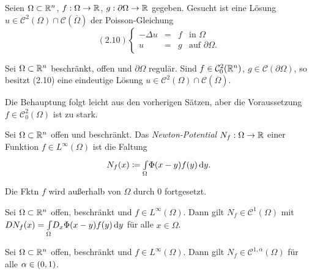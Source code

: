 \documentclass{cheat-sheet}
\begin{document}



\begin{problem}
  Seien $\Omega \subset \mathbb{R}^n$, $f : \Omega \to \mathbb{R}$, $g : \partial \Omega \to \mathbb{R}$ gegeben. Gesucht ist eine Lösung $u \in \mathcal{C}^2(\Omega) \cap \mathcal{C}(\overline{\Omega})$ der Poisson-Gleichung
  \[
    (2.10) \left\{ \begin{array}{rlll}
      - \Delta u &=& f & \text{in $\Omega$}\\
      u &=& g & \text{auf $\partial \Omega$.}
    \end{array} \right.
  \]
\end{problem}

\begin{prop}
  Sei $\Omega \subset \mathbb{R}^n$ beschränkt, offen und $\partial \Omega$ regulär. Sind $f \in \mathcal{C}^2_0(\mathbb{R}^n)$, $g \in \mathcal{C}(\partial \Omega)$, so besitzt (2.10) eine eindeutige Lösung $u \in \mathcal{C}^2(\Omega) \cap \mathcal{C}(\overline{\Omega})$.
\end{prop}

\begin{bem}
  Die Behauptung folgt leicht aus den vorherigen Sätzen, aber die Voraussetzung $f \in \mathcal{C}^2_0(\Omega)$ ist zu stark.
\end{bem}

\begin{defn}
  Sei $\Omega \subset \mathbb{R}^n$ offen und beschränkt. Das \emph{Newton-Potential} $N_f : \Omega \to \mathbb{R}$ einer Funktion $f \in L^\infty(\Omega)$ ist die Faltung
  \[ N_f(x) \coloneqq {\textstyle \int\limits_{\Omega}^{}} \Phi(x-y) f(y) \,\mathrm{d} y. \]
\end{defn}

\begin{bem}
  Die Fktn $f$ wird außerhalb von $\Omega$ durch $0$ fortgesetzt.
\end{bem}

\begin{lem}
  Sei $\Omega \subset \mathbb{R}^n$ offen, beschränkt und $f \in L^\infty(\Omega)$. Dann gilt $N_f \in \mathcal{C}^1(\Omega)$ mit $D N_f(x) = {\textstyle \int\limits_{\Omega}^{}} D_x \Phi(x-y) f(y) \,\mathrm{d} y$ für alle $x \in \Omega$.
\end{lem}

\begin{kor}
  Sei $\Omega \subset \mathbb{R}^n$ offen, beschränkt und $f \in L^\infty(\Omega)$. Dann gilt $N_f \in \mathcal{C}^{1,\alpha}(\Omega)$ für alle $\alpha \in \left( 0, 1 \right)$.
\end{kor}
\end{document}

